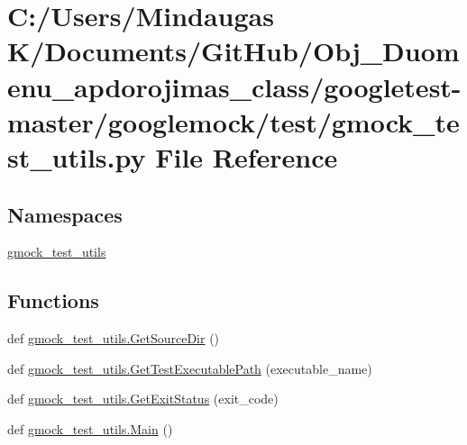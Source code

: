 \hypertarget{googletest-master_2googlemock_2test_2gmock__test__utils_8py}{}\section{C\+:/\+Users/\+Mindaugas K/\+Documents/\+Git\+Hub/\+Obj\+\_\+\+Duomenu\+\_\+apdorojimas\+\_\+class/googletest-\/master/googlemock/test/gmock\+\_\+test\+\_\+utils.py File Reference}
\label{googletest-master_2googlemock_2test_2gmock__test__utils_8py}
\subsection*{Namespaces}
\begin{DoxyCompactItemize}
\item 
 \mbox{\hyperlink{namespacegmock__test__utils}{gmock\+\_\+test\+\_\+utils}}
\end{DoxyCompactItemize}
\subsection*{Functions}
\begin{DoxyCompactItemize}
\item 
def \mbox{\hyperlink{namespacegmock__test__utils_ab7217591e655e80392c9db6b99d04765}{gmock\+\_\+test\+\_\+utils.\+Get\+Source\+Dir}} ()
\item 
def \mbox{\hyperlink{namespacegmock__test__utils_aadd2927024e24f0c53f7ba283402cdb1}{gmock\+\_\+test\+\_\+utils.\+Get\+Test\+Executable\+Path}} (executable\+\_\+name)
\item 
def \mbox{\hyperlink{namespacegmock__test__utils_a9146f81ff42389086b3eaee25dbf0263}{gmock\+\_\+test\+\_\+utils.\+Get\+Exit\+Status}} (exit\+\_\+code)
\item 
def \mbox{\hyperlink{namespacegmock__test__utils_ad79dc6aea3727ee23b5f5c454ef0d78a}{gmock\+\_\+test\+\_\+utils.\+Main}} ()
\end{DoxyCompactItemize}
